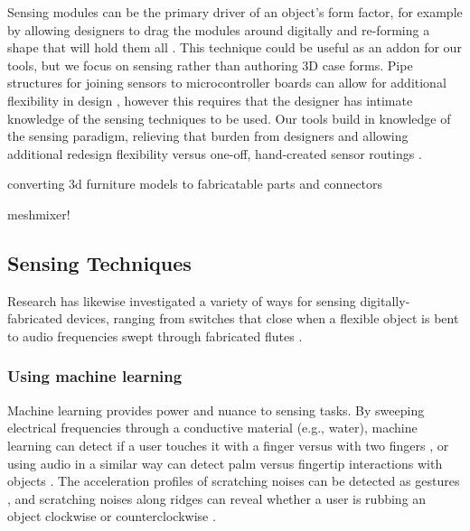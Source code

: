     Sensing modules can be the primary driver of an object's form factor, for example by allowing designers to drag the modules around digitally and re-forming a shape that will hold them all \cite{weichel-mixfab}. This technique could be useful as an addon for our tools, but we focus on sensing rather than authoring 3D case forms. Pipe structures for joining sensors to microcontroller boards can allow for additional flexibility in design \cite{savage-sot}, however this requires that the designer has intimate knowledge of the sensing techniques to be used. Our tools build in knowledge of the sensing paradigm, relieving that burden from designers and allowing additional redesign flexibility versus one-off, hand-created sensor routings \cite{navarrette-gps, park-microchannels}.
    
    \cite{lau-converting} converting 3d furniture models to fabricatable parts and connectors
    
    \cite{schmidt-meshmixer} meshmixer!

\subsection{Sensing Techniques}

    Research has likewise investigated a variety of ways for sensing digitally-fabricated devices, ranging from switches that close when a flexible object is bent \cite{slyper-structure} to audio frequencies swept through fabricated flutes \cite{laput-acoustruments}.

    \subsubsection{Using machine learning}
        Machine learning provides power and nuance to sensing tasks. By sweeping electrical frequencies through a conductive material (e.g., water), machine learning can detect if a user touches it with a finger versus with two fingers \cite{sato-touche}, or using audio in a similar way can detect palm versus fingertip interactions with objects \cite{ono-touchandactivate}. The acceleration profiles of scratching noises can be detected as gestures \cite{harrison-scratchinput}, and scratching noises along ridges can reveal whether a user is rubbing an object clockwise or counterclockwise \cite{murray-smith-stane}.
        
